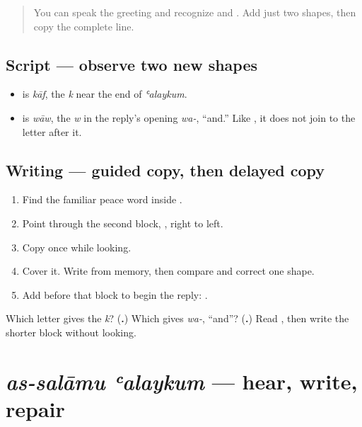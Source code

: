 \label{lesson:AR-W00-kaf-waw-alaykum}



\begin{quote}
You can speak the greeting and recognize \textbf{} and \textbf{}. Add just two shapes, then copy the complete line.
\end{quote}

\subsection*{Script — observe two new shapes}
\begin{itemize}
\raggedright
  \item \textbf{} is \emph{kāf}, the \emph{k} near the end of \emph{ʿalaykum}.
  \item \textbf{} is \emph{wāw}, the \emph{w} in the reply’s opening \emph{wa-}, “and.” Like \textbf{}, it does not join to the letter after it.
\end{itemize}

\subsection*{Writing — guided copy, then delayed copy}
\begin{enumerate}
\raggedright
  \item Find the familiar peace word inside \textbf{ }.
  \item Point through the second block, \textbf{}, right to left.
  \item Copy \textbf{ } once while looking.
  \item Cover it. Write \textbf{} from memory, then compare and correct one shape.
  \item Add \textbf{} before that block to begin the reply: \textbf{}.
\end{enumerate}

\begin{tcolorbox}[breakable,colback=teal!4,colframe=teal!35!black,title={Before you move on}]
Which letter gives the \emph{k}? (\textbf{.}) Which gives \emph{wa-}, “and”? (\textbf{.}) Read \textbf{ }, then write the shorter block \textbf{} without looking.
\end{tcolorbox}
\section[\texorpdfstring{\ar{السلام} \ar{عليكم} (as-salāmu ʿalaykum)}{السلام عليكم (as-salāmu ʿalaykum)}]{\emph{as-salāmu ʿalaykum} — hear, write, repair}

